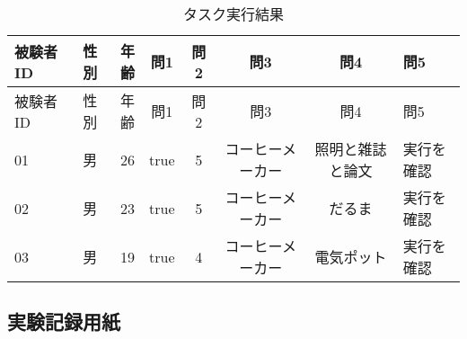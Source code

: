 \begin{longtable}[c]{@{}lrrccccl@{}}
\caption{タスク実行結果}\tabularnewline
\toprule
被験者ID & 性別 & 年齢 & 問1 & 問2 & 問3 & 問4 & 問5\tabularnewline
\midrule
\endfirsthead
\toprule
被験者ID & 性別 & 年齢 & 問1 & 問2 & 問3 & 問4 & 問5\tabularnewline
\midrule
\endhead
01 & 男 & 26 & true & 5 & コーヒーメーカー & 照明と雑誌と論文 &
実行を確認\tabularnewline
02 & 男 & 23 & true & 5 & コーヒーメーカー & だるま &
実行を確認\tabularnewline
03 & 男 & 19 & true & 4 & コーヒーメーカー & 電気ポット &
実行を確認\tabularnewline
\bottomrule
\end{longtable}

\subsection{実験記録用紙}\label{ux5b9fux9a13ux8a18ux9332ux7528ux7d19}
